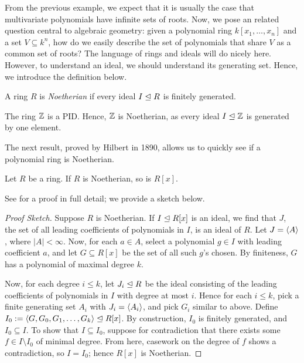 \documentclass{article}
\begin{document}
From the previous example, we expect that it is usually the case that multivariate polynomials have infinite sets of roots. Now, we pose an related question central to algebraic geometry: given a polynomial ring $k[x_1, \ldots, x_n]$ and a set $V\subseteq k^n$, how do we easily describe the set of polynomials that share $V$ as a common set of roots? The language of rings and ideals will do nicely here. However, to understand an ideal, we should understand its generating set. Hence, we introduce the definition below.
\begin{definition}
A ring $R$ is \textit{Noetherian} if every ideal $I\trianglelefteq R$ is finitely generated.
\end{definition}

\begin{example}
The ring $\mathbb Z$ is a PID. Hence, $\mathbb Z$ is Noetherian, as every ideal $I\trianglelefteq \mathbb Z$ is generated by one element.
\end{example}

The next result, proved by Hilbert in 1890, allows us to quickly see if a polynomial ring is Noetherian.
\newpage

\begin{theorem} \label{hilbertbasis}
Let $R$ be a ring. If $R$ is Noetherian, so is $R[x]$.
\end{theorem}
See \parencite[Theorem 3.11]{maliar} for a proof in full detail; we provide a sketch below. 
\begin{proof}[Proof Sketch]\renewcommand{\qedsymbol}{$\bullet$}
Suppose $R$ is Noetherian. If $I\trianglelefteq R[x]$ is an ideal, we find that $J$, the set of all leading coefficients of polynomials in $I$, is an ideal of $R$. Let $J = \left\langle A\right\rangle$, where $|A|<\infty$. Now, for each $a\in A$, select a polynomial $g\in I$ with leading coefficient $a$, and let $G\subseteq R[x]$ be the set of all such $g$'s chosen. By finiteness, $G$ has a polynomial of maximal degree $k$. 

Now, for each degree $i\leq k$, let $J_i\trianglelefteq R$ be the ideal consisting of the leading coefficients of polynomials in $I$ with degree at most $i$. Hence for each $i\leq k$, pick a finite generating set $A_i$ with $J_i = \left\langle A_i\right\rangle$, and pick $G_i$ similar to above. Define $I_0 := \left\langle G, G_0, G_1, \ldots, G_k\right\rangle\trianglelefteq R[x]$. By construction, $I_0$ is finitely generated, and $I_0\subseteq I$. To show that $I\subseteq I_0$, suppose for contradiction that there exists some $f\in I\setminus I_0$ of minimal degree. From here, casework on the degree of $f$ shows a contradiction, so $I = I_0$; hence $R[x]$ is Noetherian.
\end{proof}
\end{document}
